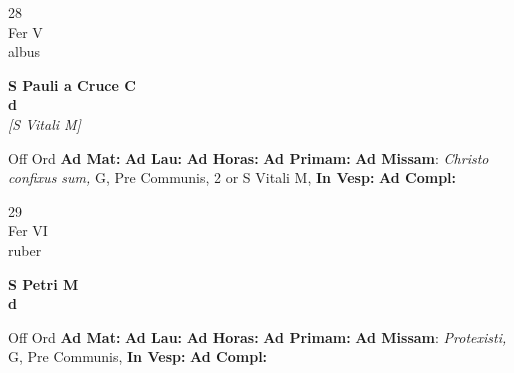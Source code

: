 \documentclass[10pt, openany]{book}
\begin{document}
    \begin{center}
        \begin{minipage}{3.5in}
            \vspace{2em}
            \begin{minipage}{0.5in}
                {\Huge 28} \\
                {\normalsize Fer V} \\
                {\normalsize albus}
            \end{minipage}
            \begin{minipage}{3.0in}
                \textbf{ \large S Pauli a Cruce C \\
                \textnormal{\normalsize d}} \\ \textit{[S Vitali M]} \\ 
            \end{minipage}
            \begin{justify}Off Ord
                \textbf{Ad Mat: }
                \textbf{Ad Lau: }
                \textbf{Ad Horas: }
                \textbf{Ad Primam: }\textbf{Ad Missam}: \textit{Christo confixus sum,} G, Pre Communis, 2 or S Vitali M,  
                \textbf{In Vesp: }
                \textbf{Ad Compl: }
            \end{justify}
        \end{minipage}
    \end{center}

    \begin{center}
        \begin{minipage}{3.5in}
            \vspace{2em}
            \begin{minipage}{0.5in}
                {\Huge 29} \\
                {\normalsize Fer VI} \\
                {\normalsize ruber}
            \end{minipage}
            \begin{minipage}{3.0in}
                \textbf{ \large S Petri M \\
                \textnormal{\normalsize d}} \\ 
            \end{minipage}
            \begin{justify}Off Ord
                \textbf{Ad Mat: }
                \textbf{Ad Lau: }
                \textbf{Ad Horas: }
                \textbf{Ad Primam: }\textbf{Ad Missam}: \textit{Protexisti,} G, Pre Communis,  
                \textbf{In Vesp: }
                \textbf{Ad Compl: }
            \end{justify}
        \end{minipage}
    \end{center}
\end{document}
